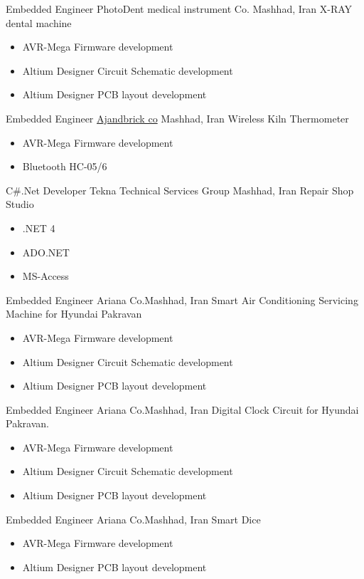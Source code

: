 	{Embedded Engineer}
	{PhotoDent medical instrument Co.}
        {Mashhad, Iran}
	{
         \newline
         X-RAY dental machine
         }
        {
        \begin{itemize}
            \item AVR-Mega Firmware development
            \item Altium Designer Circuit Schematic development
            \item Altium Designer  PCB layout development 
        \end{itemize}
        }
	{Embedded Engineer}
	{\href{http://ajandbrick.co/}{\color{blue}Ajandbrick co}}
        {Mashhad, Iran}
	{
         \newline
         Wireless Kiln Thermometer}
         {
         \begin{itemize}
             \item AVR-Mega Firmware development
             \item Bluetooth HC-05/6
         \end{itemize}
         }

	{C\#.Net Developer}
	{Tekna Technical Services Group}
        {Mashhad, Iran}
	{ \newline
         Repair Shop Studio
        }
        {
        \begin{itemize}
           \item .NET 4
           \item ADO.NET 
           \item MS-Access
        \end{itemize}
        }


	{Embedded Engineer}
	{Ariana Co.}{Mashhad, Iran}
	{
         \newline
        Smart Air Conditioning Servicing Machine for Hyundai Pakravan
        }
        {\begin{itemize}
            \item AVR-Mega Firmware development
            \item Altium Designer Circuit Schematic development
            \item Altium Designer  PCB layout development 
        \end{itemize}}


	{Embedded Engineer}
	{Ariana Co.}{Mashhad, Iran}
	{
        \newline 
        Digital Clock Circuit for Hyundai Pakravan.
        }
        {
        \begin{itemize}
            \item AVR-Mega Firmware development
            \item Altium Designer Circuit Schematic development
            \item Altium Designer  PCB layout development 
        \end{itemize}
        }

	{Embedded Engineer}
	{Ariana Co.}{Mashhad, Iran}
	{
        \newline 
        Smart Dice
        }
        {
        \begin{itemize}
            \item AVR-Mega Firmware development
            \item Altium Designer  PCB layout development 
        \end{itemize}
        }


 
